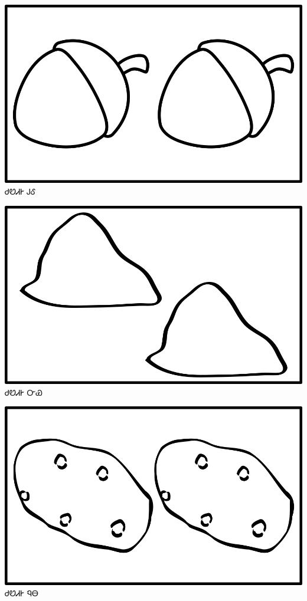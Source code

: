 \documentclass[avery5371]{flashcards}%
\begin{document}
    \begin{flashcard}{
        \includegraphics[width=0.95\columnwidth,height=.51\columnwidth,keepaspectratio]{../artwork/objects-neutral/tali-gule}
    }
        \Huge ᏧᏬᏗᎨ ᎫᎴ
    \end{flashcard}

    \begin{flashcard}{
        \includegraphics[width=0.95\columnwidth,height=.51\columnwidth,keepaspectratio]{../artwork/objects-neutral/tali-nvya}
    }
        \Huge ᏧᏬᏗᎨ ᏅᏯ
    \end{flashcard}

    \begin{flashcard}{
        \includegraphics[width=0.95\columnwidth,height=.51\columnwidth,keepaspectratio]{../artwork/objects-neutral/tali-nuna}
    }
        \Huge ᏧᏬᏗᎨ ᏄᎾ
    \end{flashcard}
\end{document}
